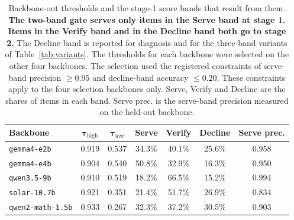 \begin{table}[t]
\small\setlength{\tabcolsep}{3pt}
\caption{Backbone-out thresholds and the stage-1 score bands that result from them. \textbf{The two-band gate serves only items in the Serve band at stage 1. Items in the Verify band and in the Decline band both go to stage 2.} The Decline band is reported for diagnosis and for the three-band variants of Table~\ref{tab:variants}. The thresholds for each backbone were selected on the other four backbones. The selection used the registered constraints of serve-band precision $\geq 0.95$ and decline-band accuracy $\leq 0.20$. These constraints apply to the four selection backbones only. Serve, Verify and Decline are the shares of items in each band. Serve prec. is the serve-band precision measured on the held-out backbone.\label{tab:thresholds}}
\begin{tabularx}{\textwidth}{lCCCCCC}
\toprule
\textbf{Backbone} & $\boldsymbol{\tau_{\mathrm{high}}}$ & $\boldsymbol{\tau_{\mathrm{low}}}$ & \textbf{Serve} & \textbf{Verify} & \textbf{Decline} & \textbf{Serve prec.} \\
\midrule
\texttt{gemma4-e2b} & 0.919 & 0.537 & 34.3\% & 40.1\% & 25.6\% & 0.958 \\
\texttt{gemma4-e4b} & 0.904 & 0.540 & 50.8\% & 32.9\% & 16.3\% & 0.950 \\
\texttt{qwen3.5-9b} & 0.910 & 0.519 & 18.2\% & 66.5\% & 15.2\% & 0.994 \\
\texttt{solar-10.7b} & 0.921 & 0.351 & 21.4\% & 51.7\% & 26.9\% & 0.834 \\
\texttt{qwen2-math-1.5b} & 0.933 & 0.267 & 32.3\% & 37.2\% & 30.5\% & 0.903 \\
\bottomrule
\end{tabularx}
\end{table}
